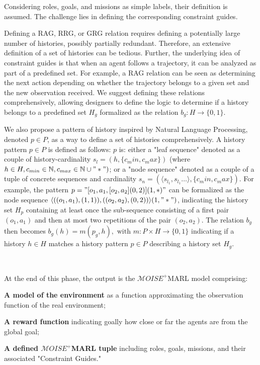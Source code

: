 \documentclass[pdflatex,sn-mathphys-num]{sn-jnl}%
\theoremstyle{thmstyleone}%
\theoremstyle{thmstyletwo}%
\theoremstyle{thmstylethree}%
\begin{document}
Considering roles, goals, and missions as simple labels, their definition is assumed. The challenge lies in defining the corresponding constraint guides.

Defining a RAG, RRG, or GRG relation requires defining a potentially large number of histories, possibly partially redundant. Therefore, an extensive definition of a set of histories can be tedious. Further, the underlying idea of constraint guides is that when an agent follows a trajectory, it can be analyzed as part of a predefined set. For example, a RAG relation can be seen as determining the next action depending on whether the trajectory belongs to a given set and the new observation received. We suggest defining these relations comprehensively, allowing designers to define the logic to determine if a history belongs to a predefined set $H_g$ formalized as the relation $b_g: H \to \{0,1\}$.

We also propose a pattern of history inspired by Natural Language Processing, denoted $p \in P$, as a way to define a set of histories comprehensively. A history pattern $p \in P$ is defined as follows: $p$ is: either a "leaf sequence" denoted as a couple of history-cardinality $s_l = (h, \{c_min,c_max\})$ (where $h \in H, c_{min} \in \mathbb{N}, c_{max} \in \mathbb{N} \cup "*")$; or a "node sequence" denoted as a couple of a tuple of concrete sequences and cardinality $s_n = (\langle s_{l_1}, s_{l_1}\dots \rangle, \{c_min,c_max\})$. For example, the pattern $p = \allowbreak "[o_1,a_1,[o_2,a_2](0,2)](1,*)"$ can be formalized as the node sequence $\allowbreak \langle ((o_1,a_1),(1,1)), ((o_2,a_2),(0,2))\rangle(1,"*")$, indicating the history set $H_p$ containing at least once the sub-sequence consisting of a first pair $(o_1,a_1)$ and then at most two repetitions of the pair $(o_2,a_2)$.
The relation $b_g$ then becomes $b_g(h) = m(p_g,h), \text{ with } m: P \times H \to \{0,1\}$ indicating if a history $h \in H$ matches a history pattern $p \in P$ describing a history set $H_g$.

\

At the end of this phase, the output is the $\mathcal{M}OISE^+$MARL model comprising:
\begin{enumerate*}[label={\roman*)}]
    \item \textbf{A model of the environment} as a function approximating the observation function of the real environment;
    \item \textbf{A reward function} indicating goally how close or far the agents are from the global goal;
    \item \textbf{A defined $\mathcal{M}OISE^+$MARL tuple} including roles, goals, missions, and their associated "Constraint Guides."
\end{enumerate*}
\end{document}
